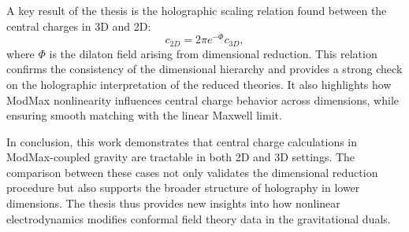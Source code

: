 \documentclass[11pt, a4paper, twoside]{Thesis} %
\begin{document}
{A key result of the thesis is the holographic scaling relation found between the central charges in 3D and 2D:
\[
c_{2D} = 2\pi e^{-\Phi} c_{3D},
\]
where $\Phi$ is the dilaton field arising from dimensional reduction. This relation confirms the consistency of the dimensional hierarchy and provides a strong check on the holographic interpretation of the reduced theories. It also highlights how ModMax nonlinearity influences central charge behavior across dimensions, while ensuring smooth matching with the linear Maxwell limit.

In conclusion, this work demonstrates that central charge calculations in ModMax-coupled gravity are tractable in both 2D and 3D settings. The comparison between these cases not only validates the dimensional reduction procedure but also supports the broader structure of holography in lower dimensions. The thesis thus provides new insights into how nonlinear electrodynamics modifies conformal field theory data in the gravitational duals.
}





\end{document}
